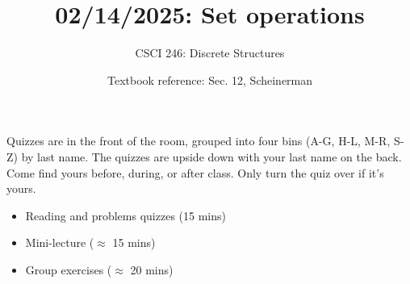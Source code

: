 \documentclass[10pt]{beamer}
\begin{document}






\title{02/14/2025: Set operations}
\author{CSCI 246: Discrete Structures}
\date{Textbook reference: Sec. 12, Scheinerman}

\begin{frame}
    \titlepage 
\end{frame}


\begin{frame}
\footnotesize 
\begin{mygreenbox}[title=Graded Quiz Pickup]
Quizzes are in the front of the room, grouped into four bins (A-G, H-L, M-R, S-Z) by last name. The quizzes are upside down with your last name on the back. Come find yours before, during, or after class.  Only turn the quiz over if it's yours.
\end{mygreenbox} 
\vfill 

%
%
%


\begin{myyellowbox}[title=Today's Agenda]
\begin{itemize}
	\item Reading and problems quizzes (15 mins)
	\item Mini-lecture ($\approx$ 15 mins)
	\item Group exercises ($\approx$ 20 mins)
\end{itemize}

\end{myyellowbox}
\vfill 

\end{frame}
\end{document}
